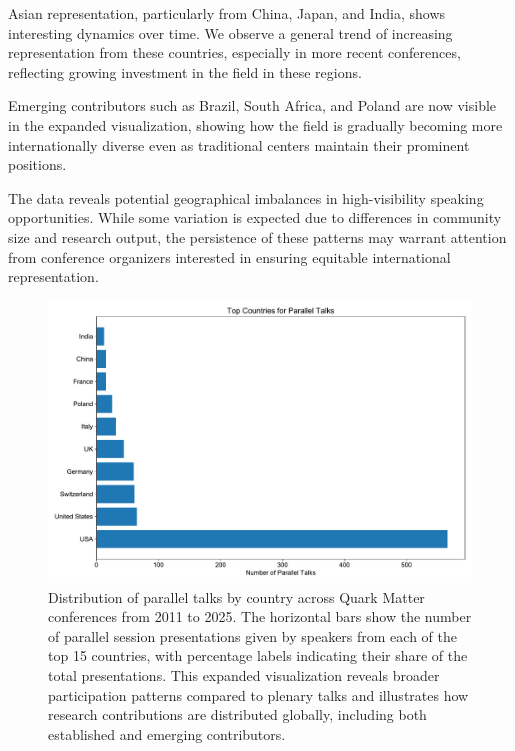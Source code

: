 \documentclass[a4paper,11pt]{article}
\begin{document}
Asian representation, particularly from China, Japan, and India, shows interesting dynamics over time. We observe a general trend of increasing representation from these countries, especially in more recent conferences, reflecting growing investment in the field in these regions.

Emerging contributors such as Brazil, South Africa, and Poland are now visible in the expanded visualization, showing how the field is gradually becoming more internationally diverse even as traditional centers maintain their prominent positions.

The data reveals potential geographical imbalances in high-visibility speaking opportunities. While some variation is expected due to differences in community size and research output, the persistence of these patterns may warrant attention from conference organizers interested in ensuring equitable international representation.

\begin{figure}[H]
\centering
\includegraphics[width=\textwidth]{figures/parallel_talks_by_country.pdf}
\caption{Distribution of parallel talks by country across Quark Matter conferences from 2011 to 2025. The horizontal bars show the number of parallel session presentations given by speakers from each of the top 15 countries, with percentage labels indicating their share of the total presentations. This expanded visualization reveals broader participation patterns compared to plenary talks and illustrates how research contributions are distributed globally, including both established and emerging contributors.}
\label{fig:country_parallel}
\end{figure}
\end{document}

